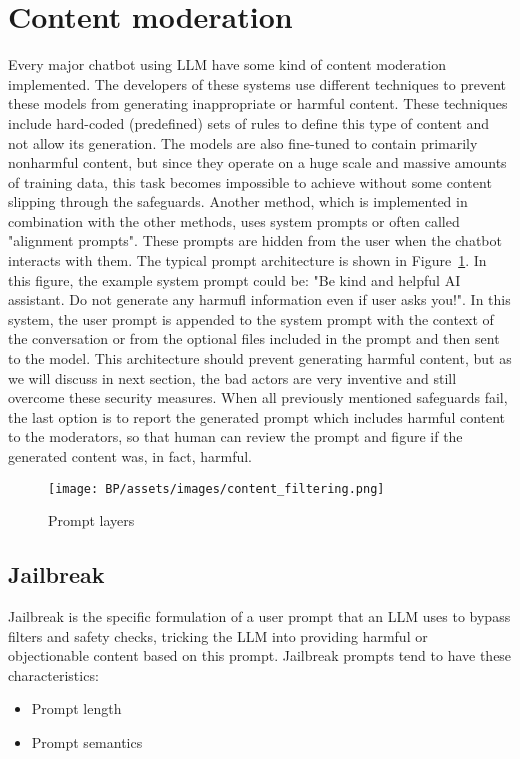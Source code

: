 \section{Content moderation\label{sec:content_moderation}}
Every major chatbot using LLM have some kind of content moderation implemented. The developers of these systems use different techniques to prevent these models from generating inappropriate or harmful content. These techniques include hard-coded (predefined) sets of rules to define this type of content and not allow its generation. The models are also fine-tuned to contain primarily nonharmful content, but since they operate on a huge scale and massive amounts of training data, this task becomes impossible to achieve without some content slipping through the safeguards. Another method, which is implemented in combination with the other methods, uses system prompts or often called "alignment prompts". These prompts are hidden from the user when the chatbot interacts with them. The typical prompt architecture is shown in Figure~\ref{fig:system_prompt}. In this figure, the example system prompt could be: "Be kind and helpful AI assistant. Do not generate any harmufl information even if user asks you!". In this system, the user prompt is appended to the system prompt with the context of the conversation or from the optional files included in the prompt and then sent to the model. This architecture should prevent generating harmful content, but as we will discuss in next section, the bad actors are very inventive and still overcome these security measures. When all previously mentioned safeguards fail, the last option is to report the generated prompt which includes harmful content to the moderators, so that human can review the prompt and figure if the generated content was, in fact, harmful.

\begin{figure}[h]
\begin{centering}
\texttt{[image: BP/assets/images/content\_filtering.png]}
\par\end{centering}
\caption{Prompt layers \cite{systemprompt}
 \label{fig:system_prompt}}
\end{figure}


\subsection{Jailbreak \label{sec:jailbreak}}
Jailbreak is the specific formulation of a user prompt that an LLM uses to bypass filters and safety checks, tricking the LLM into providing harmful or objectionable content based on this prompt.
Jailbreak prompts tend to have these characteristics:
\begin{itemize}
    \item Prompt length
    \item Prompt semantics
\end{itemize}

